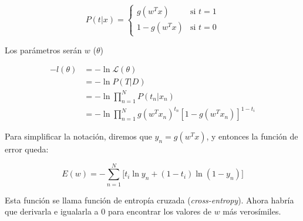 \begin{equation*}
    P(t | x) =
    \begin{cases}
        g(w^Tx) &\text{si } t = 1 \\
        1 - g(w^Tx) &\text{si } t = 0
    \end{cases}
\end{equation*}

Los parámetros serán $w$ ($\theta$)

\begin{align*}
    -l(\theta) &= -\ln \mathcal{L}(\theta) \\
    &= -\ln P(T | D) \\
    &= -\ln \prod_{n = 1}^{N} P(t_n | x_n) \\
    &= -\ln \prod_{n = 1}^{N} g(w^Tx_n)^{t_n}[1 - g(w^Tx_n)]^{1 - t_i}
\end{align*}

Para simplificar la notación, diremos que $y_n = g(w^Tx)$, y entonces la función de error queda:

\begin{equation*}
    E(w) = -\sum_{n = 1}^{N}
    \Big[
        t_i\ln y_n + (1 - t_i)\ln(1 - y_n)
    \Big]
\end{equation*}


Esta función se llama función de entropía cruzada (\textit{cross-entropy}). Ahora habría que derivarla e igualarla a 0 para encontrar los valores de $w$ más verosímiles.



